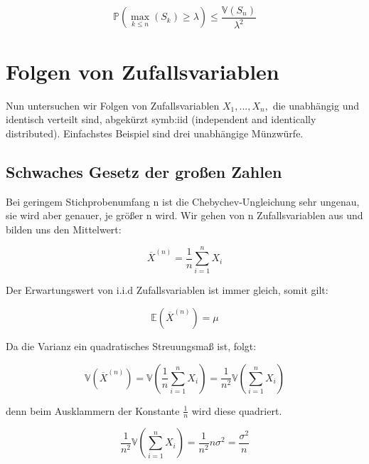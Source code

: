 {\begin{definition}
    \[\mathbb P\left(\max_{k\le n}\left(S_{k}\right)\ge \lambda\right)\le 
        \frac{\mathbb V\left(S_{n}\right)}{\lambda ^{2}}\]
    \end{definition}
    


    \section{Folgen von Zufallsvariablen}

    Nun untersuchen wir Folgen von Zufallsvariablen $X_{1},...,X_{n},$ die unabhängig und identisch
    verteilt sind, abgekürzt \gls{symb:iid} (independent and identically distributed). 
    Einfachstes Beispiel sind drei unabhängige Münzwürfe.

    \subsection{Schwaches Gesetz der großen Zahlen}

    Bei geringem Stichprobenumfang n ist die Chebychev-Ungleichung sehr
    ungenau, sie wird aber genauer, je größer n wird. Wir gehen von n
    Zufallsvariablen aus und bilden uns den Mittelwert:

    \[\overline{X}^{\left(n\right)}=\frac{1}{n}\sum_{i=1}^{n}X_{i}\]

    Der Erwartungswert von i.i.d Zufallsvariablen ist immer gleich, somit gilt:

    \[\mathbb E\left(\overline{X}^{\left(n\right)}\right)=\mu\]

    Da die Varianz ein quadratisches Streuungsmaß ist, folgt:

    \[\mathbb V\left(\overline{X}^{\left(n\right)}\right)=
        \mathbb V\left(\frac{1}{n}\sum_{i=1}^{n}X_{i}\right)=
        \frac{1}{n^{2}}\mathbb V\left(\sum_{i=1}^{n}X_{i}\right)\]

    denn beim Ausklammern der Konstante $\frac{1}{n}$ wird diese quadriert.

    \[\frac{1}{n^{2}}\mathbb V\left(\sum_{i=1}^{n}X_{i}\right)=\frac{1}{n^{2}}n\sigma ^{2}=\frac{\sigma^{2}}{n}\]


}
